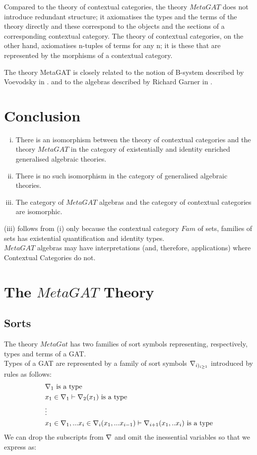 \documentclass[10pt,a4paper]{article}
\begin{document}
Compared to the theory of contextual categories, the theory $MetaGAT$ does not introduce redundant structure; it axiomatises the types and the terms of the theory directly and these correspond to the objects and the sections of a corresponding contextual category. The theory of contextual categories, on the other hand, axiomatises n-tuples of terms for any n; it is  these that are represented by the morphisms of a contextual category.  

The theory MetaGAT is closely related to the notion of B-system described by Voevodsky in
\cite{Voevodsky14B}.
and to the algebras described by Richard Garner in \cite{Garner15}.  

\section{Conclusion}

\begin{enumerate}[(i)]
\item There is an isomorphism between the theory of contextual categories and the theory $MetaGAT$ in the category of existentially and identity enriched generalised algebraic theories. 
\item There is no such isomorphism in the category of generalised algebraic theories.
\item The category of $MetaGAT$ algebras and the category of contextual categories are isomorphic. 
\end{enumerate}

\noindent (iii) follows from (i) only because the contextual category $Fam$ of sets, families of sets has existential quantification and identity types. \\

\noindent $MetaGAT$ algebras may have interpretations (and, therefore, applications) where Contextual Categories do not.

\section{The $MetaGAT$ Theory}

\subsection*{Sorts}
The theory $MetaGat$ has two families of sort symbols representing, respectively,  types and terms of a GAT. \\

\noindent Types of a GAT are represented by a family of sort symbols $\nabla_{i)_{i\geq 1}}$ introduced by rules as follows: 
\begin{align*}
&\nabla_1\mbox{ is a type} \\
&x_1 \in \nabla_1 \vdash \nabla_2(x_1)\mbox{ is a type} \\
& \vdots \\
&x_1 \in \nabla_1,... x_{i} \in \nabla_{i}(x_1,...x_{i-1}) \vdash \nabla_{i+1}(x_1, ..x_{i})\mbox{ is a type} \\
\end{align*}
\noindent We can drop the subscripts from $\nabla$ and omit the inessential variables so that we express as:
\end{document}
